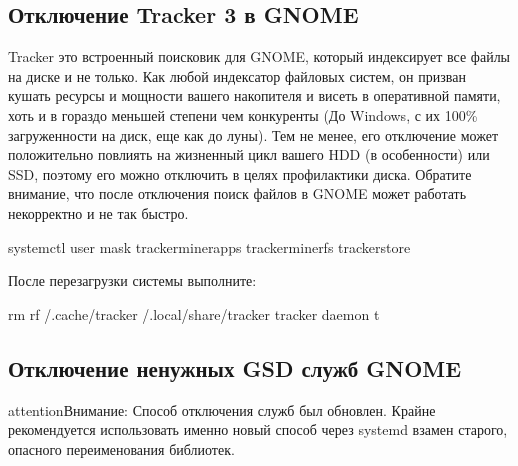 \documentclass[letterpaper,10pt,russian,openany]{sphinxmanual}
\begin{document}
\ignorespaces 

\subsection{Отключение Tracker 3 в GNOME}
\label{\detokenize{source/de-optimizations:tracker-3-gnome}}\label{\detokenize{source/de-optimizations:disabling-tracker-3}}\label{\detokenize{source/de-optimizations:index-3}}
\sphinxAtStartPar
Tracker \sphinxhyphen{} это встроенный поисковик для GNOME, который индексирует все файлы на диске и не только.
Как любой индексатор файловых систем, он призван кушать ресурсы и мощности вашего накопителя и висеть в оперативной памяти,
хоть и в гораздо меньшей степени чем конкуренты (До Windows, с их 100\% загруженности на диск, еще как до луны).
Тем не менее, его отключение может положительно повлиять на жизненный цикл вашего HDD (в особенности) или SSD,
поэтому его можно отключить в целях профилактики диска.
Обратите внимание, что после отключения поиск файлов в GNOME может работать некорректно и не так быстро.

\sphinxAtStartPar
{}

\begin{sphinxVerbatim}[commandchars=\\\{\}]
systemctl \PYGZhy{}\PYGZhy{}user mask tracker\PYGZhy{}miner\PYGZhy{}apps tracker\PYGZhy{}miner\PYGZhy{}fs tracker\PYGZhy{}store
\end{sphinxVerbatim}

\sphinxAtStartPar
После перезагрузки системы выполните:

\begin{sphinxVerbatim}[commandchars=\\\{\}]
rm \PYGZhy{}rf \PYGZti{}/.cache/tracker \PYGZti{}/.local/share/tracker   
tracker daemon \PYGZhy{}t                                
\end{sphinxVerbatim}

\ignorespaces 

\subsection{Отключение ненужных GSD служб GNOME}
\label{\detokenize{source/de-optimizations:gsd-gnome}}\label{\detokenize{source/de-optimizations:disabling-gsd-daemons}}\label{\detokenize{source/de-optimizations:index-4}}
\begin{sphinxadmonition}{attention}{Внимание:}
\sphinxAtStartPar
Способ отключения служб был обновлен.
Крайне рекомендуется использовать именно новый способ через systemd взамен старого, опасного переименования библиотек.
\end{sphinxadmonition}
\end{document}

